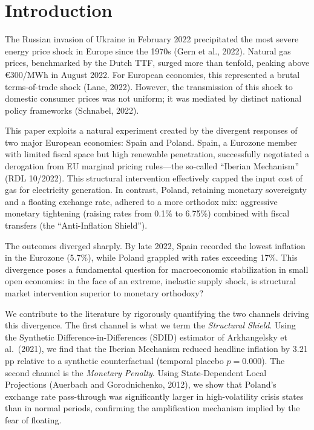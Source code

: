 \documentclass[12pt, a4paper]{article}
\begin{document}
\newpage


\section{Introduction}

The Russian invasion of Ukraine in February 2022 precipitated the most severe energy price shock in Europe since the 1970s (Gern et al., 2022). Natural gas prices, benchmarked by the Dutch TTF, surged more than tenfold, peaking above \euro300/MWh in August 2022. For European economies, this represented a brutal terms-of-trade shock (Lane, 2022). However, the transmission of this shock to domestic consumer prices was not uniform; it was mediated by distinct national policy frameworks (Schnabel, 2022).

This paper exploits a natural experiment created by the divergent responses of two major European economies: Spain and Poland. Spain, a Eurozone member with limited fiscal space but high renewable penetration, successfully negotiated a derogation from EU marginal pricing rules---the so-called ``Iberian Mechanism'' (RDL 10/2022). This structural intervention effectively capped the input cost of gas for electricity generation. In contrast, Poland, retaining monetary sovereignty and a floating exchange rate, adhered to a more orthodox mix: aggressive monetary tightening (raising rates from 0.1\% to 6.75\%) combined with fiscal transfers (the ``Anti-Inflation Shield'').

The outcomes diverged sharply. By late 2022, Spain recorded the lowest inflation in the Eurozone (5.7\%), while Poland grappled with rates exceeding 17\%. This divergence poses a fundamental question for macroeconomic stabilization in small open economies: in the face of an extreme, inelastic supply shock, is structural market intervention superior to monetary orthodoxy?

We contribute to the literature by rigorously quantifying the two channels driving this divergence. The first channel is what we term the \textit{Structural Shield}. Using the Synthetic Difference-in-Differences (SDID) estimator of Arkhangelsky et al.\ (2021), we find that the Iberian Mechanism reduced headline inflation by 3.21 pp relative to a synthetic counterfactual (temporal placebo $p=0.000$). The second channel is the \textit{Monetary Penalty}. Using State-Dependent Local Projections (Auerbach and Gorodnichenko, 2012), we show that Poland's exchange rate pass-through was significantly larger in high-volatility crisis states than in normal periods, confirming the amplification mechanism implied by the fear of floating.
\end{document}
